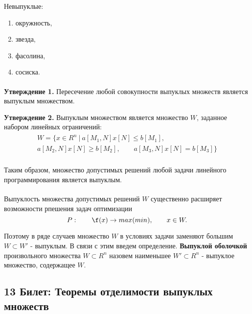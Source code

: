\documentclass[14pt, letterpaper]{article}
\begin{document}
Невыпуклые:
\begin{enumerate}
    \item окружность,
    \item звезда,
    \item фасолина, 
    \item сосиска.
\end{enumerate}

\paragraph{}
\textbf{Утверждение 1.} Пересечение любой совокупности выпуклых множеств является выпуклым множеством.

\textbf{Утверждение 2.} Выпуклым множеством является множество $W$, заданное набором линейных ограничений:
\begin{displaymath}
   	\begin{split}
   		\begin{aligned}
   			W = \{ x \in R^{n}\: | \: a[M_{1},N]x[N] \leq b[M_{1}], \\ a[M_{2},N]x[N] \geq b[M_{2}], \qquad a[M_{3},N]x[N] = b[M_{3}] \}
   		\end{aligned}
   	\end{split}
   \end{displaymath}
\paragraph{}
Таким образом, множество допустимых решений любой задачи линейного программирования является выпуклым.

\paragraph{}
Выпуклость множества допустимых решений $W$ существенно расширяет возможности рпешения задач оптимизации
    $$P: \qquad \f(x) \rightarrow max(min), \qquad x \in W.$$

Поэтому в ряде случаев множество $W$ в условиях задачи заменяют большим $W \subset W\prime$ - выпуклым. В связи с этим введем определение. \textbf{Выпуклой оболочкой} произвольного множества $W \subset R^{n}$ назовем наименьшее $W\prime \subset R^{n}$ - выпуклое множество, содержащее $W$.

\newpage
\subsection{13 Билет: Теоремы отделимости выпуклых множеств}
\end{document}
